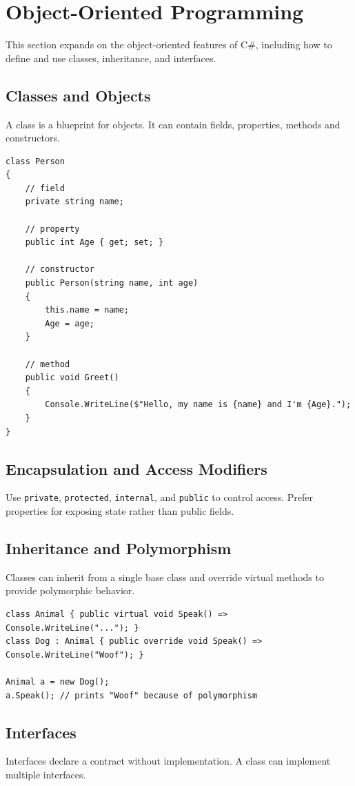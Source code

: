 \documentclass{article}
\begin{document}
\section{Object-Oriented Programming}
This section expands on the object-oriented features of C\#, including how to define and use classes, inheritance, and interfaces.

\subsection{Classes and Objects}
A class is a blueprint for objects. It can contain fields, properties, methods and constructors.

\begin{verbatim}
class Person
{
    // field
    private string name;

    // property
    public int Age { get; set; }

    // constructor
    public Person(string name, int age)
    {
        this.name = name;
        Age = age;
    }

    // method
    public void Greet()
    {
        Console.WriteLine($"Hello, my name is {name} and I'm {Age}.");
    }
}
\end{verbatim}

\subsection{Encapsulation and Access Modifiers}
Use \texttt{private}, \texttt{protected}, \texttt{internal}, and \texttt{public} to control access. Prefer properties for exposing state rather than public fields.

\subsection{Inheritance and Polymorphism}
Classes can inherit from a single base class and override virtual methods to provide polymorphic behavior.

\begin{verbatim}
class Animal { public virtual void Speak() => Console.WriteLine("..."); }
class Dog : Animal { public override void Speak() => Console.WriteLine("Woof"); }

Animal a = new Dog();
a.Speak(); // prints "Woof" because of polymorphism
\end{verbatim}

\subsection{Interfaces}
Interfaces declare a contract without implementation. A class can implement multiple interfaces.
\end{document}
